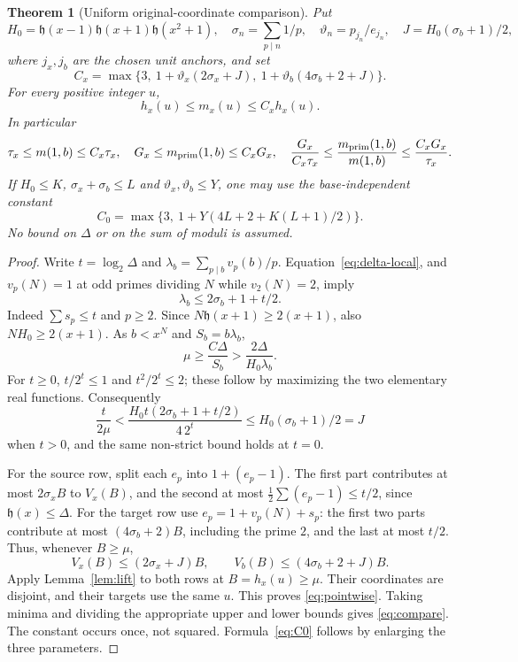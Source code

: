 \documentclass[11pt,a4paper]{article}
\newtheorem{theorem}{Theorem}[section]
\theoremstyle{definition}\newtheorem{question}[theorem]{Question}
\theoremstyle{remark}\newtheorem{remark}[theorem]{Remark}
\newcommand{\hh}{\mathfrak h}\newcommand{\ee}{\mathrm e}
\begin{document}
\begin{theorem}[Uniform original-coordinate comparison]\label{thm:comparison}
Put
\[
 H_0=\hh(x-1)\hh(x+1)\hh(x^2+1),\quad
 \sigma_n=\sum_{p\mid n}1/p,\quad
 \vartheta_n=p_{j_n}/e_{j_n},\quad J=H_0(\sigma_b+1)/2,
\]
where $j_x,j_b$ are the chosen unit anchors, and set
\begin{equation}\label{eq:Cx}
 C_x=\max\{3,\ 1+\vartheta_x(2\sigma_x+J),\
                    1+\vartheta_b(4\sigma_b+2+J)\}.
\end{equation}
For every positive integer $u$,
\begin{equation}\label{eq:pointwise}
 h_x(u)\le m_x(u)\le C_x h_x(u).
\end{equation}
In particular
\begin{equation}\label{eq:compare}
 \tau_x\le m(1,b)\le C_x\tau_x,\quad
 G_x\le m_{\mathrm{prim}}(1,b)\le C_xG_x,\quad
 \frac{G_x}{C_x\tau_x}\le\frac{m_{\mathrm{prim}}(1,b)}{m(1,b)}
 \le\frac{C_xG_x}{\tau_x}.
\end{equation}
If $H_0\le K$, $\sigma_x+\sigma_b\le L$ and
$\vartheta_x,\vartheta_b\le Y$, one may use the base-independent
constant
\begin{equation}\label{eq:C0}
 C_0=\max\{3,\ 1+Y(4L+2+K(L+1)/2)\}.
\end{equation}
No bound on $\Delta$ or on the sum of moduli is assumed.
\end{theorem}
\begin{proof}
Write $t=\log_2\Delta$ and $\lambda_b=\sum_{p\mid b}v_p(b)/p$.
Equation~\eqref{eq:delta-local}, and $v_p(N)=1$ at odd primes
dividing $N$ while $v_2(N)=2$, imply
\begin{equation}\label{eq:lambda-est}
 \lambda_b\le2\sigma_b+1+t/2.
\end{equation}
Indeed $\sum s_p\le t$ and $p\ge2$.
Since $N\hh(x+1)\ge2(x+1)$, also $NH_0\ge2(x+1)$.
As $b<x^N$ and $S_b=b\lambda_b$,
\[
 \mu\ge\frac{C\Delta}{S_b}>\frac{2\Delta}{H_0\lambda_b}.
\]
For $t\ge0$, $t/2^t\le1$ and $t^2/2^t\le2$; these follow by
maximizing the two elementary real functions. Consequently
\[
 \frac{t}{2\mu}<\frac{H_0t(2\sigma_b+1+t/2)}{4\,2^t}
 \le H_0(\sigma_b+1)/2=J
\]
when $t>0$, and the same non-strict bound holds at $t=0$.

For the source row, split each $e_p$ into $1+(e_p-1)$.
The first part contributes at most $2\sigma_xB$ to $V_x(B)$,
and the second at most $\tfrac12\sum(e_p-1)\le t/2$, since
$\hh(x)\le\Delta$. For the target row use
$e_p=1+v_p(N)+s_p$: the first two parts contribute at most
$(4\sigma_b+2)B$, including the prime $2$, and the last at most $t/2$.
Thus, whenever $B\ge\mu$,
\[
 V_x(B)\le(2\sigma_x+J)B,\qquad
 V_b(B)\le(4\sigma_b+2+J)B.
\]
Apply Lemma~\ref{lem:lift} to both rows at $B=h_x(u)\ge\mu$.
Their coordinates are disjoint, and their targets use the same $u$.
This proves \eqref{eq:pointwise}. Taking minima and dividing the
appropriate upper and lower bounds gives \eqref{eq:compare}.
The constant occurs once, not squared. Formula~\eqref{eq:C0} follows
by enlarging the three parameters.
\end{proof}
\end{document}
